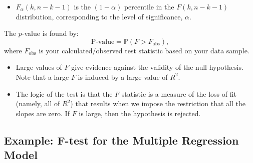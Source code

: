 \documentclass[
  12pt,
  letterpaper,
]{scrbook}
\providecommand{\tightlist}{%
  \setlength{\itemsep}{0pt}\setlength{\parskip}{0pt}}
\renewcommand{\tightlist}{\setlength{\itemsep}{0.5\baselineskip}\setlength{\parskip}{0.2\baselineskip}}
\theoremstyle{plain}
\theoremstyle{definition}
\theoremstyle{remark}
\begin{document}
\begin{itemize}
\tightlist
\item
  \(F_{\alpha}(k,n-k-1)\) is the \((1-\alpha)\) percentile in the
  \(F(k, n-k-1)\) distribution, corresponding to the level of
  significance, \(\alpha\).
\end{itemize}

The \(p\)-value is found by: \[
\text{P-value} = \mathbb{P}(F>F_{\text{obs}}) ,
\] where \(F_{\text{obs}}\) is your calculated/observed test statistic
based on your data sample.

\begin{itemize}
\item
  Large values of \(F\) give evidence against the validity of the null
  hypothesis. Note that a large \(F\) is induced by a large value of
  \(R^2\).
\item
  The logic of the test is that the \(F\) statistic is a measure of the
  loss of fit (namely, all of \(R^2\)) that results when we impose the
  restriction that all the slopes are zero. If \(F\) is large, then the
  hypothesis is rejected.
\end{itemize}

\subsection{Example: F-test for the Multiple Regression
Model}\label{example-f-test-for-the-multiple-regression-model}
\end{document}
